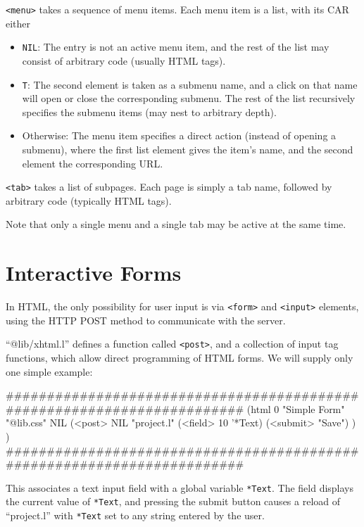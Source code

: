 \texttt{<menu>} takes a sequence of menu items. Each menu item is a list, with
its CAR either

\begin{itemize}
\item \texttt{NIL}: The entry is not an active menu item, and the rest of the list
   may consist of arbitrary code (usually HTML tags).
\item \texttt{T}: The second element is taken as a submenu name, and a click on
   that name will open or close the corresponding submenu. The rest of
   the list recursively specifies the submenu items (may nest to
   arbitrary depth).
\item Otherwise: The menu item specifies a direct action (instead of
   opening a submenu), where the first list element gives the item's
   name, and the second element the corresponding URL.
\end{itemize}

\texttt{<tab>} takes a list of subpages. Each page is simply a tab name,
followed by arbitrary code (typically HTML tags).

Note that only a single menu and a single tab may be active at the same
time.


\section{Interactive Forms}
\label{sec:appl-devel-interactive-forms}


In HTML, the only possibility for user input is via \texttt{<form>} and
\texttt{<input>} elements, using the HTTP POST method to communicate with the
server.

``@lib/xhtml.l'' defines a function called \texttt{<post>}, and a collection of
input tag functions, which allow direct programming of HTML forms. We
will supply only one simple example:


\begin{wideverbatim}
########################################################################
(html 0 "Simple Form" "@lib.css" NIL
   (<post> NIL "project.l"
      (<field> 10 '*Text)
      (<submit> "Save") ) )
########################################################################
\end{wideverbatim}

This associates a text input field with a global variable \texttt{*Text}. The
field displays the current value of \texttt{*Text}, and pressing the submit
button causes a reload of ``project.l'' with \texttt{*Text} set to any string
entered by the user.

